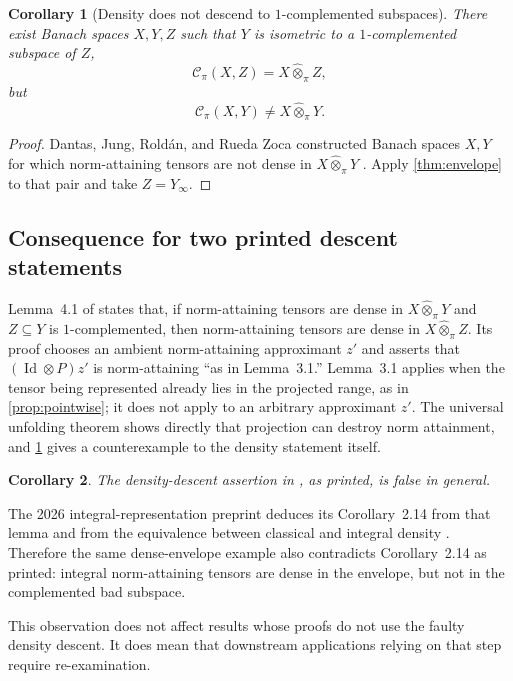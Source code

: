 \documentclass[11pt]{article}
\newtheorem{corollary}[corollary]{Corollary}
\theoremstyle{definition}
\theoremstyle{remark}
\newcommand{\whot}{\widehat\otimes_\pi}
\newcommand{\id}{\operatorname{Id}}
\newcommand{\Cpi}{\mathscr C_\pi}
\begin{document}
\begin{corollary}[Density does not descend to $1$-complemented subspaces]\label{cor:density-descent-false}
There exist Banach spaces $X,Y,Z$ such that $Y$ is isometric to a $1$-complemented subspace of $Z$,
\[
 \Cpi(X,Z)=X\whot Z,
\]
but
\[
 \Cpi(X,Y)\neq X\whot Y.
\]
\end{corollary}

\begin{proof}
Dantas, Jung, Rold\'an, and Rueda Zoca constructed Banach spaces $X,Y$ for which norm-attaining tensors are not dense in $X\whot Y$ \cite[Theorem 5.1]{DantasEtAl2022}.  Apply \cref{thm:envelope} to that pair and take $Z=Y_\infty$.
\end{proof}

\subsection{Consequence for two printed descent statements}

Lemma~4.1 of \cite{GarciaLirolaEtAl2025} states that, if norm-attaining tensors are dense in $X\whot Y$ and $Z\subseteq Y$ is $1$-complemented, then norm-attaining tensors are dense in $X\whot Z$.  Its proof chooses an ambient norm-attaining approximant $z'$ and asserts that $(\id\otimes P)z'$ is norm-attaining ``as in Lemma~3.1.''  Lemma~3.1 applies when the tensor being represented already lies in the projected range, as in \cref{prop:pointwise}; it does not apply to an arbitrary approximant $z'$.  The universal unfolding theorem shows directly that projection can destroy norm attainment, and \cref{cor:density-descent-false} gives a counterexample to the density statement itself.

\begin{corollary}\label{cor:printed-lemma}
The density-descent assertion in \cite[Lemma 4.1]{GarciaLirolaEtAl2025}, as printed, is false in general.
\end{corollary}

The 2026 integral-representation preprint deduces its Corollary~2.14 from that lemma and from the equivalence between classical and integral density \cite[Corollaries 2.12 and 2.14]{AliagaEtAl2026}.  Therefore the same dense-envelope example also contradicts Corollary~2.14 as printed: integral norm-attaining tensors are dense in the envelope, but not in the complemented bad subspace.

This observation does not affect results whose proofs do not use the faulty density descent.  It does mean that downstream applications relying on that step require re-examination.
\end{document}
